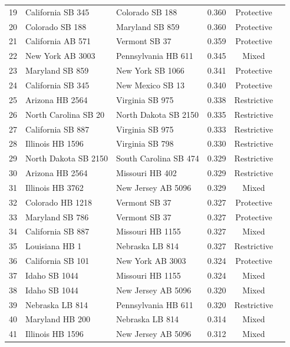 \documentclass[12pt]{report}
\begin{document}
\begin{longtable}{rlllcl}
19 & California SB 345    & Colorado SB 188      & 0.360 & Protective  \\
20 & Colorado SB 188      & Maryland SB 859      & 0.360 & Protective  \\
21 & California AB 571    & Vermont SB 37        & 0.359 & Protective  \\
22 & New York AB 3003     & Pennsylvania HB 611  & 0.345 & Mixed       \\
23 & Maryland SB 859      & New York SB 1066     & 0.341 & Protective  \\
24 & California SB 345    & New Mexico SB 13     & 0.340 & Protective  \\
25 & Arizona HB 2564      & Virginia SB 975      & 0.338 & Restrictive \\
26 & North Carolina SB 20 & North Dakota SB 2150 & 0.335 & Restrictive \\
27 & California SB 887    & Virginia SB 975      & 0.333 & Restrictive \\
28 & Illinois HB 1596     & Virginia SB 798      & 0.330 & Restrictive \\
29 & North Dakota SB 2150 & South Carolina SB 474 & 0.329 & Restrictive \\
30 & Arizona HB 2564      & Missouri HB 402      & 0.329 & Restrictive \\
31 & Illinois HB 3762     & New Jersey AB 5096   & 0.329 & Mixed       \\
32 & Colorado HB 1218     & Vermont SB 37        & 0.327 & Protective  \\
33 & Maryland SB 786      & Vermont SB 37        & 0.327 & Protective  \\
34 & California SB 887    & Missouri HB 1155     & 0.327 & Mixed       \\
35 & Louisiana HB 1       & Nebraska LB 814      & 0.327 & Restrictive \\
36 & California SB 101    & New York AB 3003     & 0.324 & Protective  \\
37 & Idaho SB 1044        & Missouri HB 1155     & 0.324 & Mixed       \\
38 & Idaho SB 1044        & New Jersey AB 5096   & 0.320 & Mixed       \\
39 & Nebraska LB 814      & Pennsylvania HB 611  & 0.320 & Restrictive \\
40 & Maryland HB 200      & Nebraska LB 814      & 0.314 & Mixed       \\
41 & Illinois HB 1596     & New Jersey AB 5096   & 0.312 & Mixed       \\

\end{longtable}
\end{document}
